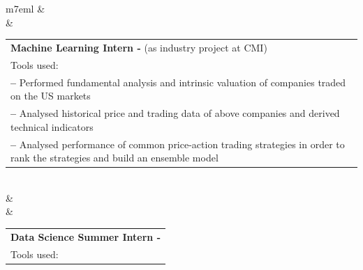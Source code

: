 \documentclass[11pt]{extarticle}
\makeatletter
\DeclareRobustCommand*\myul{%
    \def\SOUL@everyspace{\underline{\space}\kern\z@}
    \def\SOUL@everytoken{%
		\setbox0=\hbox{\the\SOUL@token}%
		\ifdim\dp0>\z@
        \the\SOUL@token
		\else
        \underline{\the\SOUL@token}%
		\fi}
\SOUL@}
\makeatother
\begin{document}
\begin{tabular}[H]{m{7em}l}
	&	\\[-1ex]
	 &
	\begin{tabular}{@{}p{39em}@{}}
		{\textbf{Machine Learning Intern - \sffamily{Hodu Solutions}}} (as industry project at CMI)      \\
		Tools used:\textcolor{deeporange}{\hspace{-2.7mm}\myul{Python, pandas, yahoo-finance}}  \\
		\textbf{--} Performed fundamental analysis and intrinsic valuation of companies traded on the US markets   \\
		\textbf{--} Analysed historical price and trading data of above companies and derived technical indicators \\
		\textbf{--} Analysed performance of common price-action trading strategies in order to rank the strategies and build an ensemble model
	\end{tabular}\\
	&	\\
	 &
	\begin{tabular}{@{}p{39em}@{}}
		{\textbf{Data Science Summer Intern - \sffamily{LTIMindtree}}}\\
		Tools used:\textcolor{deeporange}{\hspace{-2.7mm}\myul{Python, pandas, spaCy, BERTopic, FLASK-Restful, Streamlit}}\\

\end{tabular}
\end{tabular}
\end{document}
